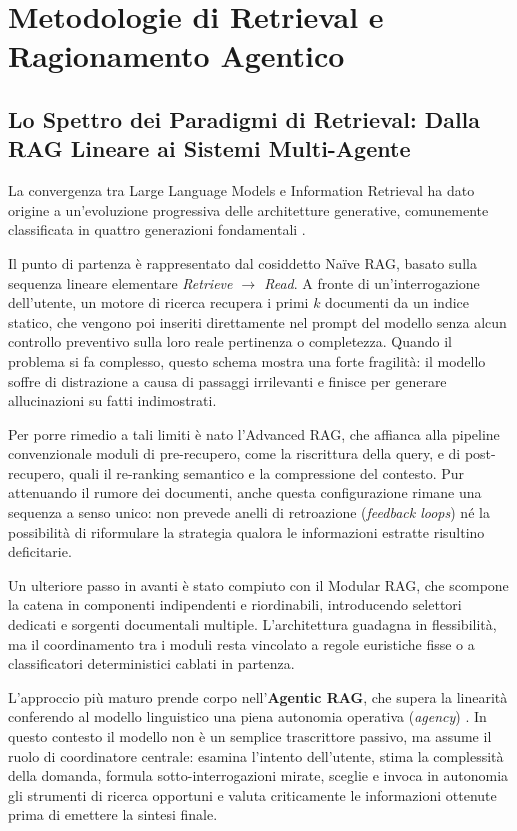 \chapter{Metodologie di Retrieval e Ragionamento Agentico}
\label{chap:metodologie}

\section{Lo Spettro dei Paradigmi di Retrieval: Dalla RAG Lineare ai Sistemi Multi-Agente}
\label{sec:spettro_rag}

La convergenza tra Large Language Models e Information Retrieval ha dato origine a un'evoluzione progressiva delle architetture generative, comunemente classificata in quattro generazioni fondamentali \cite{gao2023modular, lewis2020retrieval}.

Il punto di partenza è rappresentato dal cosiddetto Naïve RAG, basato sulla sequenza lineare elementare \textit{Retrieve $\rightarrow$ Read}. A fronte di un'interrogazione dell'utente, un motore di ricerca recupera i primi $k$ documenti da un indice statico, che vengono poi inseriti direttamente nel prompt del modello senza alcun controllo preventivo sulla loro reale pertinenza o completezza. Quando il problema si fa complesso, questo schema mostra una forte fragilità: il modello soffre di distrazione a causa di passaggi irrilevanti e finisce per generare allucinazioni su fatti indimostrati.

Per porre rimedio a tali limiti è nato l'Advanced RAG, che affianca alla pipeline convenzionale moduli di pre-recupero, come la riscrittura della query, e di post-recupero, quali il re-ranking semantico e la compressione del contesto. Pur attenuando il rumore dei documenti, anche questa configurazione rimane una sequenza a senso unico: non prevede anelli di retroazione (\textit{feedback loops}) né la possibilità di riformulare la strategia qualora le informazioni estratte risultino deficitarie.

Un ulteriore passo in avanti è stato compiuto con il Modular RAG, che scompone la catena in componenti indipendenti e riordinabili, introducendo selettori dedicati e sorgenti documentali multiple. L'architettura guadagna in flessibilità, ma il coordinamento tra i moduli resta vincolato a regole euristiche fisse o a classificatori deterministici cablati in partenza.

L'approccio più maturo prende corpo nell'\textbf{Agentic RAG}, che supera la linearità conferendo al modello linguistico una piena autonomia operativa (\textit{agency}) \cite{zhang2024ai, wu2025agentic}. In questo contesto il modello non è un semplice trascrittore passivo, ma assume il ruolo di coordinatore centrale: esamina l'intento dell'utente, stima la complessità della domanda, formula sotto-interrogazioni mirate, sceglie e invoca in autonomia gli strumenti di ricerca opportuni e valuta criticamente le informazioni ottenute prima di emettere la sintesi finale.

